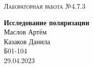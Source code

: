 \documentclass[12pt,a4paper]{extreport}
\begin{document}
	
	\begin{center}
		\large
		\textsc{Лабораторная работа №4.7.3}
		
		\LARGE
		\textbf{Исследование поляризации}
		\\[5mm]

		\large
		Маслов Артём \\
		Казаков Данила \\
		Б01-104
		\\[3mm]
		29.04.2023
	\end{center}
			
	
	
	

	

	
	
	
	
	
	
\end{document}
